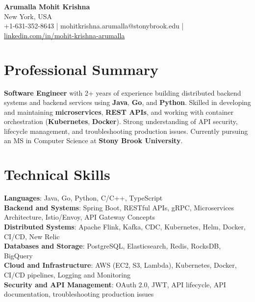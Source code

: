 \documentclass[letterpaper,11pt]{article}
\begin{document}
\begin{center}
  {\Large \textbf{Arumalla Mohit Krishna}} \\
  New York, USA \\
  +1-631-352-8643 \enspace | \enspace mohitkrishna.arumalla@stonybrook.edu \enspace | \enspace \href{https://www.linkedin.com/in/mohit-krishna-arumalla}{linkedin.com/in/mohit-krishna-arumalla}
\end{center}

\section{Professional Summary}
  \begin{itemize}[leftmargin=0.15in, label={}]
    \small{\item{
     \textbf{Software Engineer} with 2+ years of experience building distributed backend systems and backend services using \textbf{Java}, \textbf{Go}, and \textbf{Python}. Skilled in developing and maintaining \textbf{microservices}, \textbf{REST APIs}, and working with container orchestration (\textbf{Kubernetes}, \textbf{Docker}). Strong understanding of API security, lifecycle management, and troubleshooting production issues. Currently pursuing an MS in Computer Science at \textbf{Stony Brook University}.
    }}
  \end{itemize}
\vspace{-16pt}

\section{Technical Skills}
 \begin{itemize}[leftmargin=0.15in, label={}]
    \small{\item{
     \textbf{Languages}: Java, Go, Python, C/C++, TypeScript \\
     \textbf{Backend and Systems}: Spring Boot, RESTful APIs, gRPC, Microservices Architecture, Istio/Envoy, API Gateway Concepts \\
     \textbf{Distributed Systems}: Apache Flink, Kafka, CDC, Kubernetes, Helm, Docker, CI/CD, New Relic \\
     \textbf{Databases and Storage}: PostgreSQL, Elasticsearch, Redis, RocksDB, BigQuery \\
     \textbf{Cloud and Infrastructure}: AWS (EC2, S3, Lambda), Kubernetes, Docker, CI/CD pipelines, Logging and Monitoring \\
     \textbf{Security and API Management}: OAuth 2.0, JWT, API lifecycle, API documentation, troubleshooting production issues
    }}
 \end{itemize}
\vspace{-16pt}
\end{document}
